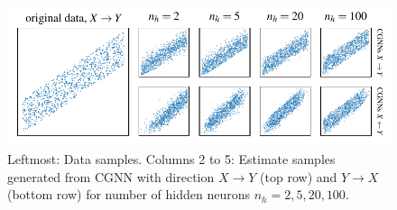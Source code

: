 \documentclass[a4paper, 11pt]{article}
\begin{document}
\begin{figure}[h!]
\begin{center}
\includegraphics[width=12cm]{parallelogram.pdf}
\caption{Leftmost: Data samples. Columns 2 to 5: Estimate samples generated from CGNN with direction $X \rightarrow Y$ (top row)  and $Y \rightarrow X$ (bottom row) for number of hidden neurons $n_h = 2, 5, 20, 100$.}
\label{figure:parallelogram}
\end{center}
\end{figure} 
\end{document}
